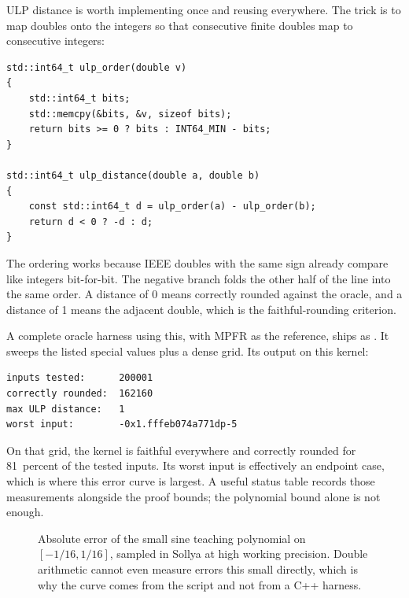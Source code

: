 \documentclass[manuscript, nonacm]{acmart}
\newcommand{\approxdata}[1]{tools/proofs/math/approx_doc/data/#1}
\begin{document}
  ULP distance is worth implementing once and reusing everywhere. The
  trick is to map doubles onto the integers so that consecutive finite
  doubles map to consecutive integers:

  \begin{lstlisting}[style=cpp]
std::int64_t ulp_order(double v)
{
    std::int64_t bits;
    std::memcpy(&bits, &v, sizeof bits);
    return bits >= 0 ? bits : INT64_MIN - bits;
}

std::int64_t ulp_distance(double a, double b)
{
    const std::int64_t d = ulp_order(a) - ulp_order(b);
    return d < 0 ? -d : d;
}
  \end{lstlisting}

  The ordering works because IEEE doubles with the same sign already compare like
  integers bit-for-bit. The negative branch folds the other half of the line into
  the same order. A distance of 0 means correctly rounded against the oracle, and
  a distance of 1 means the adjacent double, which is the faithful-rounding
  criterion.

  A complete oracle harness using this, with MPFR as the reference, ships
  as . It
  sweeps the listed special values plus a dense grid. Its output on this
  kernel:

  \begin{lstlisting}[style=output]
inputs tested:      200001
correctly rounded:  162160
max ULP distance:   1
worst input:        -0x1.fffeb074a771dp-5
  \end{lstlisting}

  On that grid, the kernel is faithful everywhere and correctly rounded for
  81~percent of the tested inputs. Its worst input is effectively an endpoint case, which is where this error
  curve is largest. A useful status table records those measurements alongside
  the proof bounds; the polynomial bound alone is not enough.

  \begin{figure}[tbp]
    \centering
    \caption{Absolute error of the small sine teaching polynomial on
      $[-1/16,1/16]$, sampled in Sollya at high working precision. Double
      arithmetic cannot even measure errors this small directly, which is why
      the curve comes from the script and not from a C++ harness.}
  \end{figure}
\end{document}
